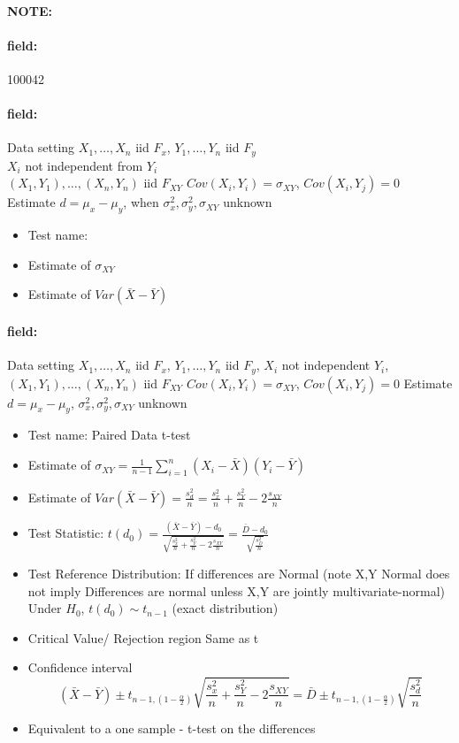 \documentclass[12pt]{article}
\newenvironment{note}{\paragraph{NOTE:}}{}
\newenvironment{field}{\paragraph{field:}}{}
\begin{document}
\begin{note} \begin{field} \tiny 100042 \end{field}
 \begin{field}
  Data setting $X_1, \ldots , X_n$ iid $F_x$, $Y_1, \ldots, Y_n$ iid $F_y$\\
   $X_i$ not independent from $Y_i$\\
    $(X_1, Y_1), \ldots , (X_n,Y_n)$ iid $F_{XY}$ $Cov(X_i,Y_i) = \sigma_{XY}$, $Cov(X_i,Y_j) = 0$
    \\ Estimate $d = \mu_x - \mu_y$, when $\sigma_x^2, \sigma_y^2, \sigma_{XY}$ unknown
  \begin{itemize}
   \item Test name:
   \item Estimate of $\sigma_{XY}$
   \item Estimate of $Var(\bar{X} - \bar{Y})$
  \end{itemize}
 \end{field}
 \begin{field}
  Data setting $X_1, \ldots , X_n$ iid $F_x$, $Y_1, \ldots, Y_n$ iid $F_y$, $X_i$ not independent $Y_i$, $(X_1, Y_1), \ldots , (X_n,Y_n)$ iid $F_{XY}$ $Cov(X_i,Y_i) = \sigma_{XY}$, $Cov(X_i,Y_j) = 0$ Estimate $d = \mu_x - \mu_y$, $\sigma_x^2, \sigma_y^2, \sigma_{XY}$ unknown
  \begin{itemize}
   \item Test name: Paired Data t-test
   \item Estimate of $\sigma_{XY} = \frac{1}{n-1} \sum_{i=1}^n (X_i - \bar{X})(Y_i - \bar{Y})$
   \item Estimate of $Var(\bar{X} - \bar{Y}) = \frac{s_d^2}{n} = \frac{s_x^2}{n} + \frac{s_Y^2}{n} - 2 \frac{s_{XY}}{n}$
   \item Test Statistic: $t(d_0) = \frac{(\bar{X} - \bar{Y}) - d_0}{\sqrt{\frac{s_x^2}{n} + \frac{s_Y^2}{n} - 2 \frac{s_{XY}}{n}}} = \frac{\bar{D} - d_0}{\sqrt{\frac{s_D^2}{n}}}$
   \item Test Reference Distribution: If differences are Normal (note X,Y Normal does not imply Differences are normal unless X,Y are jointly multivariate-normal) Under $H_0$, $t(d_0) \sim t_{n-1}$ (exact distribution)
   \item Critical Value/ Rejection region Same as t
   \item Confidence interval
         $$ (\bar{X} - \bar{Y}) \pm t_{n-1,(1 - \frac{\alpha}{2})}\sqrt{\frac{s_x^2}{n} + \frac{s_Y^2}{n} - 2 \frac{s_{XY}}{n}} = \bar{D} \pm  t_{n-1,(1 - \frac{\alpha}{2})} \sqrt{\frac{s_d^2}{n}}$$
   \item Equivalent to a one sample - t-test on the differences
  \end{itemize}
 \end{field}
\end{note}
\end{document}
